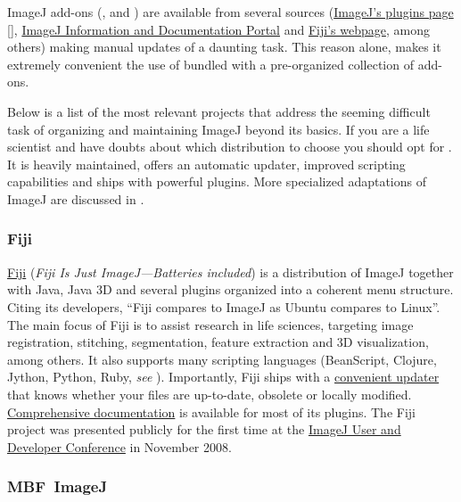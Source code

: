 ImageJ add-ons (,  and
) are available from several sources
(\href{http://imagej.nih.gov/ij/plugins/}{ImageJ's plugins page}
{[}\textsf{}{]},
\href{http://imagejdocu.tudor.lu/doku.php?id=plugin:start}{ImageJ Information and Documentation Portal}
and \href{http://fiji.sc/wiki/index.php/Category:Plugins}{Fiji's webpage},
among others) making manual updates of a daunting task. This reason
alone, makes it extremely convenient the use of 
bundled with a pre-organized collection of add-ons.

Below is a list of the most relevant projects that address the seeming
difficult task of organizing and maintaining ImageJ beyond its basics.
If you are a life scientist and have doubts about which distribution
to choose you should opt for . It is heavily
maintained, offers an automatic updater, improved scripting capabilities
and ships with powerful plugins. More specialized adaptations of ImageJ
are discussed in .


\subsubsection*{Fiji\label{sub:Fiji-intro}}

\href{http://fiji.sc/}{Fiji} (\emph{Fiji Is Just ImageJ---Batteries
included}) is a distribution of ImageJ together with Java, Java 3D
and several plugins organized into a coherent menu structure. Citing
its developers, ``Fiji compares to ImageJ as Ubuntu compares to Linux''.
The main focus of Fiji is to assist research in life sciences, targeting
image registration, stitching, segmentation, feature extraction and
3D visualization, among others. It also supports many scripting languages
(BeanScript, Clojure, Jython, Python, Ruby, \emph{see} ).
Importantly, Fiji ships with a \href{http://fiji.sc/wiki/index.php/Update_Fiji}{convenient updater}
that knows whether your files are up-to-date, obsolete or locally
modified. \href{http://fiji.sc/wiki/index.php/Documentation}{Comprehensive documentation}
is available for most of its plugins. The Fiji project was presented
publicly for the first time at the \href{http://imagejconf.tudor.lu/doku.php}{ImageJ User and Developer Conference}
in November 2008.


\subsubsection*{MBF\ ImageJ\label{sub:MBFImageJintro}}

